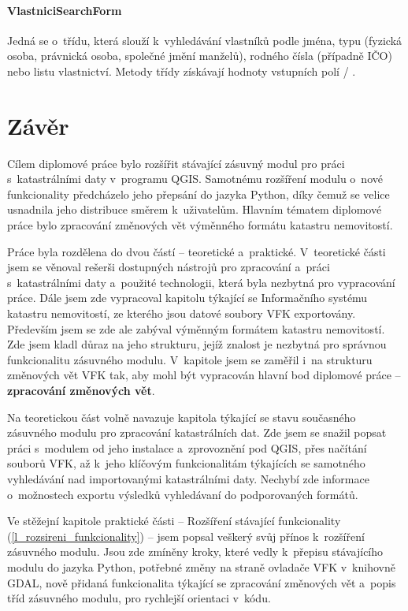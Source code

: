 \documentclass[a4paper,12pt,oneside]{book}
\begin{document}
\subsubsection{VlastniciSearchForm}
Jedná se o~třídu, která slouží k~vyhledávání vlastníků podle jména,
typu (fyzická osoba, právnická osoba, společné jmění manželů), rodného
čísla (případně IČO) nebo listu vlastnictví. Metody třídy získávají
hodnoty vstupních polí / .


\clearpage
{}       %
\chapter*{Závěr}

Cílem diplomové práce bylo rozšířit stávající zásuvný modul pro práci
s~katastrálními daty v~programu QGIS. Samotnému rozšíření modulu
o~nové funkcionality předcházelo jeho přepsání do jazyka Python, díky
čemuž se velice usnadnila jeho distribuce směrem k~uživatelům. Hlavním
tématem diplomové práce bylo zpracování změnových vět výměnného
formátu katastru nemovitostí.

Práce byla rozdělena do dvou částí -- teoretické
a~praktické. V~teoretické části jsem se věnoval rešerši dostupných
nástrojů pro zpracování a~práci s~katastrálními daty a~použité
technologii, která byla nezbytná pro vypracování práce. Dále jsem zde
vypracoval kapitolu týkající se Informačního systému katastru
nemovitostí, ze kterého jsou datové soubory VFK exportovány. Především
jsem se zde ale zabýval výměnným formátem katastru nemovitostí. Zde
jsem kladl důraz na jeho strukturu, jejíž znalost je nezbytná pro
správnou funkcionalitu zásuvného modulu. V~kapitole jsem se zaměřil
i~na strukturu změnových vět VFK tak, aby mohl být vypracován hlavní
bod diplomové práce -- \textbf{zpracování změnových vět}.

Na teoretickou část volně navazuje kapitola týkající se stavu
současného zásuvného modulu pro zpracování katastrálních dat. Zde jsem
se snažil popsat práci s~modulem od jeho instalace a~zprovoznění pod
QGIS, přes načítání souborů VFK, až k~jeho klíčovým funkcionalitám
týkajících se samotného vyhledávání nad importovanými katastrálními
daty. Nechybí zde informace o~možnostech exportu výsledků vyhledávaní
do podporovaných formátů.

Ve stěžejní kapitole praktické části -- Rozšíření stávající
funkcionality (\ref{l_rozsireni_funkcionality}) -- jsem popsal veškerý
svůj přínos k~rozšíření zásuvného modulu. Jsou zde zmíněny kroky,
které vedly k~přepisu stávajícího modulu do jazyka Python, potřebné
změny na straně ovladače VFK v~knihovně GDAL, nově přidaná
funkcionalita týkající se zpracování změnových vět a~popis tříd
zásuvného modulu, pro rychlejší orientaci v~kódu.
\end{document}
